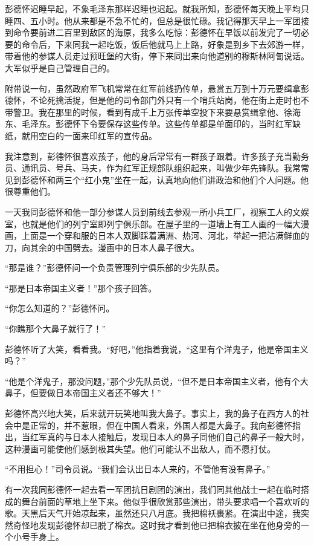 \documentclass[10pt]{book}
\begin{document}
彭德怀迟睡早起，不象毛泽东那样迟睡也迟起。就我所知，彭德怀每天晚上平均只睡四、五小时。他从来都是不急不忙的，但总是很忙碌。我记得那天早上一军团接到命令要前进二百里到敌区的海原，我多么吃惊：彭德怀在早饭以前发完了一切必要的命令后，下来同我一起吃饭，饭后他就马上上路，好象是到乡下去郊游一样，带着他的参谋人员走过预旺堡的大街，停下来同出来向他道别的穆斯林阿訇说话。大军似乎是自己管理自己的。

附带说一句，虽然政府军飞机常常在红军前线扔传单，悬赏五万到十万元要缉拿彭德怀，不论死擒活捉，但是他的司令部门外只有一个哨兵站岗，他在街上走时也不带警卫。我在那里的时候，看到有成千上万张传单空投下来要悬赏缉拿他、徐海东、毛泽东。彭德怀下令要保存这些传单。这些传单都是单面印的，当时红军缺纸，就用空白的一面来印红军的宣传品。

我注意到，彭德怀很喜欢孩子，他的身后常常有一群孩子跟着。许多孩子充当勤务员、通讯员、号兵、马夫，作为红军正规部队组织起来，叫做少年先锋队。我常常见到彭德怀和两三个“红小鬼”坐在一起，认真地向他们讲政治和他们个人问题。他很尊重他们。

一天我同彭德怀和他一部分参谋人员到前线去参观一所小兵工厂，视察工人的文娱室，也就是他们的列宁室即列宁俱乐部。在屋子里的一道墙上有工人画的一幅大漫画，上面是一个穿和服的日本人双脚踩着满洲、热河、河北，举起一把沾满鲜血的刀，向其余的中国劈去。漫画中的日本人鼻子很大。

“那是谁？”彭德怀问一个负责管理列宁俱乐部的少先队员。

“那是日本帝国主义者！”那个孩子回答。

“你怎么知道的？”彭德怀问。

“你瞧那个大鼻子就行了！”

彭德怀听了大笑，看看我。“好吧，”他指着我说，“这里有个洋鬼子，他是帝国主义吗？”

“他是个洋鬼子，那没问题，”那个少先队员说，“但不是日本帝国主义者，他有个大鼻子，但要做日本帝国主义者还不够大！”

彭德怀高兴地大笑，后来就开玩笑地叫我大鼻子。事实上，我的鼻子在西方人的社会中是正常的，并不惹眼，但在中国人看来，外国人都是大鼻子。我向彭德怀指出，当红军真的与日本人接触后，发现日本人的鼻子同他们自己的鼻子一般大时，这种漫画可能使他们感到极其失望。他们可能认不出敌人，而不愿打仗。

“不用担心！”司令员说。“我们会认出日本人来的，不管他有没有鼻子。”

有一次我同彭德怀一起去看一军团抗日剧团的演出，我们同其他战士一起在临时搭成的舞台前面的草地上坐下来。他似乎很欣赏那些演出，带头要求唱一个喜欢听的歌。天黑后天气开始凉起来，虽然还只八月底。我把棉袄裹紧。在演出中途，我突然奇怪地发现彭德怀却已脱了棉衣。这时我才看到他已把棉衣披在坐在他身旁的一个小号手身上。
\end{document}

